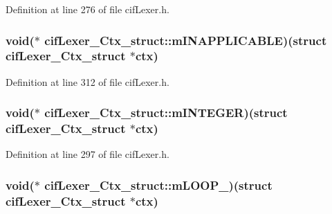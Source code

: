 Definition at line 276 of file cif\-Lexer.\-h.

\hypertarget{structcif_lexer___ctx__struct_af7c447606492fd9f3902fa59d9d8f77b}{
\subsubsection[{m\-I\-N\-A\-P\-P\-L\-I\-C\-A\-B\-L\-E}]{\setlength{\rightskip}{0pt plus 5cm}void($\ast$ cif\-Lexer\-\_\-\-Ctx\-\_\-struct\-::m\-I\-N\-A\-P\-P\-L\-I\-C\-A\-B\-L\-E)(struct {\bf cif\-Lexer\-\_\-\-Ctx\-\_\-struct} $\ast$ctx)}}\label{structcif_lexer___ctx__struct_af7c447606492fd9f3902fa59d9d8f77b}


Definition at line 312 of file cif\-Lexer.\-h.

\hypertarget{structcif_lexer___ctx__struct_a44ba852dec6f6c657af3b4098123babf}{
\subsubsection[{m\-I\-N\-T\-E\-G\-E\-R}]{\setlength{\rightskip}{0pt plus 5cm}void($\ast$ cif\-Lexer\-\_\-\-Ctx\-\_\-struct\-::m\-I\-N\-T\-E\-G\-E\-R)(struct {\bf cif\-Lexer\-\_\-\-Ctx\-\_\-struct} $\ast$ctx)}}\label{structcif_lexer___ctx__struct_a44ba852dec6f6c657af3b4098123babf}


Definition at line 297 of file cif\-Lexer.\-h.

\hypertarget{structcif_lexer___ctx__struct_aa989e62a85ac713e66b7dc2bcb7339e4}{
\subsubsection[{m\-L\-O\-O\-P\-\_\-}]{\setlength{\rightskip}{0pt plus 5cm}void($\ast$ cif\-Lexer\-\_\-\-Ctx\-\_\-struct\-::m\-L\-O\-O\-P\-\_\-)(struct {\bf cif\-Lexer\-\_\-\-Ctx\-\_\-struct} $\ast$ctx)}}\label{structcif_lexer___ctx__struct_aa989e62a85ac713e66b7dc2bcb7339e4}


